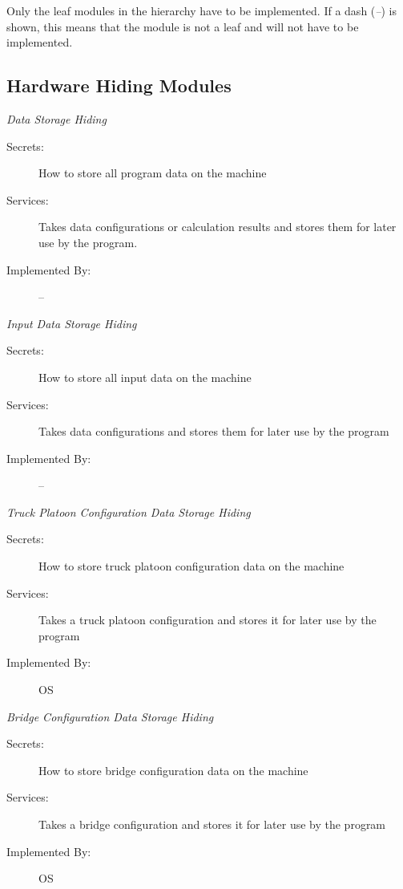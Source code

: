 \documentclass[12pt, titlepage]{article}
\begin{document}
Only the leaf modules in the hierarchy have to be implemented. If a dash
(\emph{--}) is shown, this means that the module is not a leaf and will not have
to be implemented.

\subsection{Hardware Hiding Modules}
\emph{{\large Data Storage Hiding}}
    \begin{description}
        \item[Secrets:] How to store all program data on the machine
        \item[Services:]Takes data configurations or calculation results and stores them for later use by the program.
        \item[Implemented By:] -- \\
    \end{description}
    \emph{{\large Input Data Storage Hiding}}
    \begin{description}
        \item[Secrets:] How to store all input data on the machine
        \item[Services:] Takes data configurations and stores them for later use by the program
        \item[Implemented By:] -- \\
    \end{description}
    \emph{{\large Truck Platoon Configuration Data Storage Hiding}}
    \begin{description}
        \item[Secrets:] How to store truck platoon configuration data on the machine
        \item[Services:]Takes a truck platoon configuration and stores it for later use by the program
        \item[Implemented By:] OS\\
    \end{description}
    \emph{{\large Bridge Configuration Data Storage Hiding}}
    \begin{description}
        \item[Secrets:] How to store bridge configuration data on the machine
        \item[Services:]Takes a bridge configuration and stores it for later use by the program
        \item[Implemented By:] OS\\
    \end{description}
\end{document}
